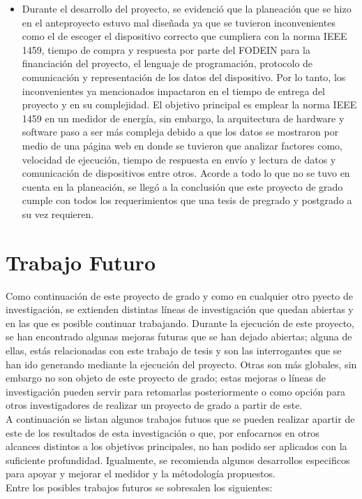 \begin{itemize}
    \item Durante el desarrollo del proyecto, se evidenció que la planeación que se hizo en el anteproyecto estuvo mal diseñada ya que se tuvieron inconvenientes como el de escoger el dispositivo correcto que cumpliera con la norma IEEE 1459, tiempo de compra y respuesta por parte del FODEIN para la financiación del proyecto, el lenguaje de programación, protocolo de comunicación y representación de los datos del dispositivo. Por lo tanto, los inconvenientes ya mencionados impactaron en el tiempo de entrega del proyecto y en su complejidad. El objetivo principal es emplear la norma IEEE 1459 en un medidor de energía, sin embargo, la arquitectura de hardware y software paso a ser más compleja debido a que los datos se mostraron por medio de una página web en donde se tuvieron que analizar factores como, velocidad de ejecución, tiempo de respuesta en envío y lectura de datos y comunicación de dispositivos entre otros. Acorde a todo lo que no se tuvo en cuenta en la planeación, se llegó a la conclusión que este proyecto de grado cumple con todos los requerimientos que una tesis de pregrado y postgrado a su vez requieren.
\end{itemize}
\chapter{ Trabajo Futuro}
Como continuación de este proyecto de grado y como en cualquier otro pyecto de investigación, se extienden distintas líneas de investigación que quedan abiertas y en las que es posible continuar trabajando. Durante la ejecución de este proyecto, se han encontrado algunas mejoras futuras que se han dejado abiertas; alguna de ellas, estás relacionadas con este trabajo de tesis y son las interrogantes que se han ido generando mediante la ejecución del proyecto. Otras son más globales, sin embargo no son objeto de este proyecto de grado; estas mejoras o líneas de investigación pueden servir para retomarlas posteriormente o como opción para otros investigadores de realizar un proyecto de grado a partir de este. \\

A continuación se listan algunos trabajos futuos que se pueden realizar apartir de este de los resultados de esta investigación o que, por enfocarnos en otros alcances distintos a los objetivos principales, no han podido ser aplicados con la suficiente profundidad. Igualmente, se recomienda algunos desarrollos especificos para apoyar y mejorar el medidor y la métodología propuestos. \\
Entre los posibles trabajos futuros se sobresalen los siguientes:

